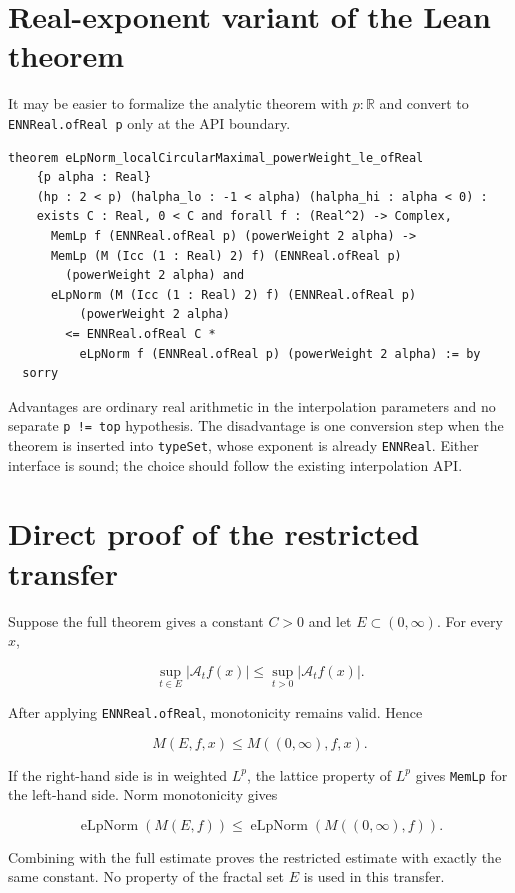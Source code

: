 \documentclass[11pt,a4paper]{article}
\theoremstyle{definition}
\theoremstyle{remark}
\newcommand{\R}{\mathbb{R}}
\newcommand{\A}{\mathcal{A}}
\newcommand{\abs}[1]{\left\lvert #1\right\rvert}
\newcommand{\lean}{\texttt}
\begin{document}
\appendix

\section{Real-exponent variant of the Lean theorem}

It may be easier to formalize the analytic theorem with $p:\R$ and convert to
\lean{ENNReal.ofReal p} only at the API boundary.

\begin{lstlisting}
theorem eLpNorm_localCircularMaximal_powerWeight_le_ofReal
    {p alpha : Real}
    (hp : 2 < p) (halpha_lo : -1 < alpha) (halpha_hi : alpha < 0) :
    exists C : Real, 0 < C and forall f : (Real^2) -> Complex,
      MemLp f (ENNReal.ofReal p) (powerWeight 2 alpha) ->
      MemLp (M (Icc (1 : Real) 2) f) (ENNReal.ofReal p)
        (powerWeight 2 alpha) and
      eLpNorm (M (Icc (1 : Real) 2) f) (ENNReal.ofReal p)
          (powerWeight 2 alpha)
        <= ENNReal.ofReal C *
          eLpNorm f (ENNReal.ofReal p) (powerWeight 2 alpha) := by
  sorry
\end{lstlisting}

Advantages are ordinary real arithmetic in the interpolation parameters and no
separate \lean{p != top} hypothesis.  The disadvantage is one conversion step
when the theorem is inserted into \lean{typeSet}, whose exponent is already
\lean{ENNReal}.  Either interface is sound; the choice should follow the
existing interpolation API.

\section{Direct proof of the restricted transfer}

Suppose the full theorem gives a constant $C>0$ and let
$E\subset(0,\infty)$.  For every $x$,

\[
\sup_{t\in E}\abs{\A_t f(x)}
\leq
\sup_{t>0}\abs{\A_t f(x)}.
\]

After applying \lean{ENNReal.ofReal}, monotonicity remains valid.  Hence

\[
M(E,f,x)\leq M((0,\infty),f,x).
\]

If the right-hand side is in weighted $L^p$, the lattice property of $L^p$
gives \lean{MemLp} for the left-hand side.  Norm monotonicity gives

\[
\operatorname{eLpNorm}(M(E,f))
\leq
\operatorname{eLpNorm}(M((0,\infty),f)).
\]

Combining with the full estimate proves the restricted estimate with exactly
the same constant.  No property of the fractal set $E$ is used in this transfer.
\end{document}
